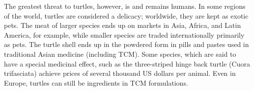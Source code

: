 The greatest threat to turtles, however, is and remains humans. In some regions of the world, turtles are considered a delicacy; worldwide, they are kept as exotic pets. The meat of larger species ends up on markets in Asia, Africa, and Latin America, for example, while smaller species are traded internationally primarily as pets. The turtle shell ends up in the powdered form in pills and pastes used in traditional Asian medicine (including TCM). Some species, which are said to have a special medicinal effect, such as the three-striped hinge back turtle (Cuora trifasciata) achieve prices of several thousand US dollars per animal. Even in Europe, turtles can still be ingredients in TCM formulations.